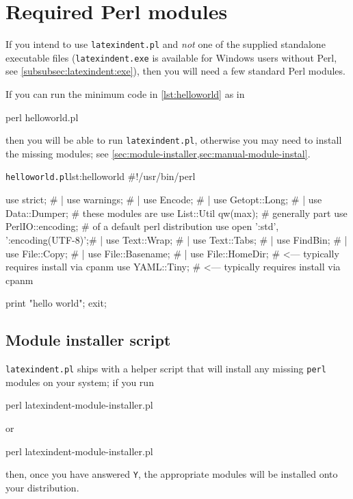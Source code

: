 \appendix
 \section{Required Perl modules}\label{sec:requiredmodules}
  If you intend to use \texttt{latexindent.pl} and \emph{not} one of the supplied
  standalone executable files (\texttt{latexindent.exe} is available for Windows users
  without Perl, see \cref{subsubsec:latexindent:exe}), then you will need a few standard
  Perl modules.

  If you can run the minimum code in \cref{lst:helloworld} as in
  \begin{commandshell}
perl helloworld.pl
  \end{commandshell}
  then you will be able to run \texttt{latexindent.pl}, otherwise you may need to install
  the missing modules; see \cref{sec:module-installer,sec:manual-module-instal}.

  \begin{cmhlistings}[style=tcblatex,language=Perl]{\texttt{helloworld.pl}}{lst:helloworld}
#!/usr/bin/perl

use strict;                         #     |
use warnings;                       #     |
use Encode;                         #     |
use Getopt::Long;                   #     |
use Data::Dumper;                   #  these modules are      
use List::Util qw(max);             #  generally part         
use PerlIO::encoding;               #  of a default perl distribution 
use open ':std', ':encoding(UTF-8)';#     |
use Text::Wrap;                     #     |
use Text::Tabs;                     #     |
use FindBin;                        #     |
use File::Copy;                     #     |
use File::Basename;                 #     |
use File::HomeDir;                  # <--- typically requires install via cpanm
use YAML::Tiny;                     # <--- typically requires install via cpanm

print "hello world";
exit;
\end{cmhlistings}

 \subsection{Module installer script}\label{sec:module-installer}
   \texttt{latexindent.pl} ships with a
  helper script that will install any missing \texttt{perl} modules on your system; if you
  run
  \begin{commandshell}
perl latexindent-module-installer.pl
\end{commandshell}
  or
  \begin{dosprompt}
perl latexindent-module-installer.pl
 \end{dosprompt}
  then, once you have answered \texttt{Y}, the appropriate modules will be installed onto
  your distribution.

